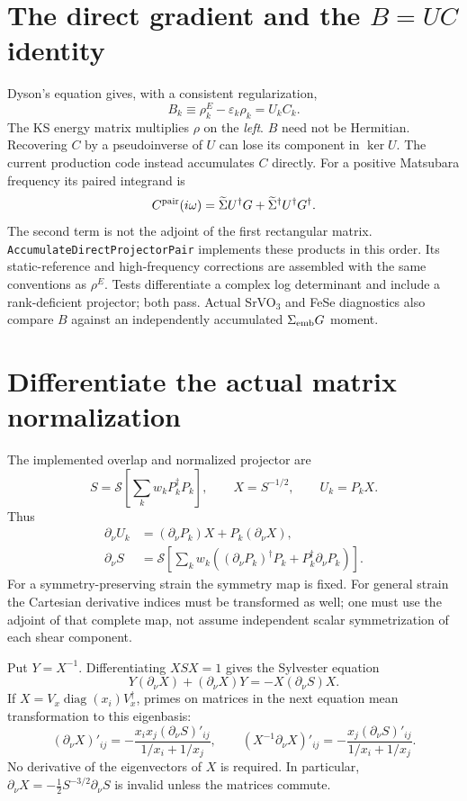 \documentclass[11pt]{article}
\newcommand{\dd}{\partial_\nu}
\newcommand{\Sig}{\widetilde\Sigma}
\newcommand{\Sym}{\mathcal S}
\begin{document}
\section{The direct gradient and the $B=UC$ identity}
Dyson's equation gives, with a consistent regularization,
\begin{equation}
B_k\equiv\rho^E_k-\varepsilon_k\rho_k=U_k C_k.\label{eq:B}
\end{equation}
The KS energy matrix multiplies $\rho$ on the \emph{left}. $B$ need not be
Hermitian. Recovering $C$ by a pseudoinverse of $U$ can lose its component
in $\ker U$. The current production code instead accumulates $C$ directly.
For a positive Matsubara frequency its paired integrand is
\begin{equation}
C^{\rm pair}(i\omega)=
\Sig U^\dagger G+\Sig^\dagger U^\dagger G^\dagger.\label{eq:pair}
\end{equation}
The second term is not the adjoint of the first rectangular matrix.
\texttt{AccumulateDirectProjectorPair} implements these products in this order.
Its static-reference and high-frequency corrections are assembled with the
same conventions as $\rho^E$. Tests differentiate a complex log determinant
and include a rank-deficient projector; both pass. Actual SrVO$_3$ and FeSe
diagnostics also compare $B$ against an independently accumulated
$\Sigma_{\rm emb}G$ moment.

\section{Differentiate the actual matrix normalization}
The implemented overlap and normalized projector are
\begin{equation}
S=\Sym\!\left[\sum_k w_k P_k^\dagger P_k\right],\qquad
X=S^{-1/2},\qquad U_k=P_kX.\label{eq:norm}
\end{equation}
Thus
\begin{align}
\dd U_k&=(\dd P_k)X+P_k(\dd X),\\
\dd S&=\Sym\!\left[\sum_k w_k
 ((\dd P_k)^\dagger P_k+P_k^\dagger\dd P_k)\right].\label{eq:dS}
\end{align}
For a symmetry-preserving strain the symmetry map is fixed. For general
strain the Cartesian derivative indices must be transformed as well; one
must use the adjoint of that complete map, not assume independent scalar
symmetrization of each shear component.

Put $Y=X^{-1}$. Differentiating $XSX=1$ gives the Sylvester equation
\begin{equation}
Y(\dd X)+(\dd X)Y=-X(\dd S)X.\label{eq:sylvester}
\end{equation}
If $X=V_x\operatorname{diag}(x_i)V_x^\dagger$, primes on matrices in the
next equation mean transformation to this eigenbasis:
\begin{equation}
(\dd X)'_{ij}=-\frac{x_i x_j(\dd S)'_{ij}}{1/x_i+1/x_j},\qquad
(X^{-1}\dd X)'_{ij}=-\frac{x_j(\dd S)'_{ij}}{1/x_i+1/x_j}.
\end{equation}
No derivative of the eigenvectors of $X$ is required. In particular,
$\dd X=-\tfrac12S^{-3/2}\dd S$ is invalid unless the matrices commute.
\end{document}
